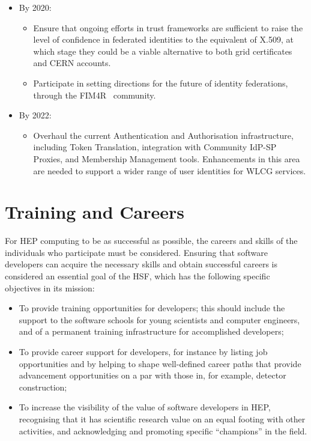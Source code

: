 \documentclass[12pt,a4paper]{article}
\begin{document}
\begin{itemize}
\item
By 2020:
\begin{itemize}
\item
  Ensure that ongoing efforts in trust frameworks are sufficient to
  raise the level of confidence in federated identities to the
  equivalent of X.509, at which stage they could be a viable alternative
  to both grid certificates and CERN accounts.
\item
  Participate in setting directions for the future of identity
  federations, through the FIM4R~\cite{FIM4R} community.
\end{itemize}
\item
By 2022:
\begin{itemize}
\item
  Overhaul the current Authentication and Authorisation infrastructure,
  including Token Translation, integration with Community IdP-SP
  Proxies, and Membership Management tools. Enhancements in this area
  are needed to support a wider range of user identities for WLCG
  services.
\end{itemize}
\end{itemize}

\hypertarget{training-and-careers}{%
\section{Training and Careers}\label{training-and-careers}}

For HEP computing to be as successful as possible, the careers and
skills of the individuals who participate must be considered. Ensuring
that software developers can acquire the necessary skills and obtain
successful careers is considered an essential goal of the HSF, which has
the following specific objectives in its mission:

\begin{itemize}
\item
  To provide training opportunities for developers; this should include
  the support to the software schools for young scientists and computer
  engineers, and of a permanent training infrastructure for accomplished
  developers;
\item
  To provide career support for developers, for instance by listing job
  opportunities and by helping to shape well-defined career paths that
  provide advancement opportunities on a par with those in, for example,
  detector construction;
\item
  To increase the visibility of the value of software developers in HEP,
  recognising that it has scientific research value on an equal footing
  with other activities, and acknowledging and promoting specific
  ``champions'' in the field.
\end{itemize}
\end{document}
